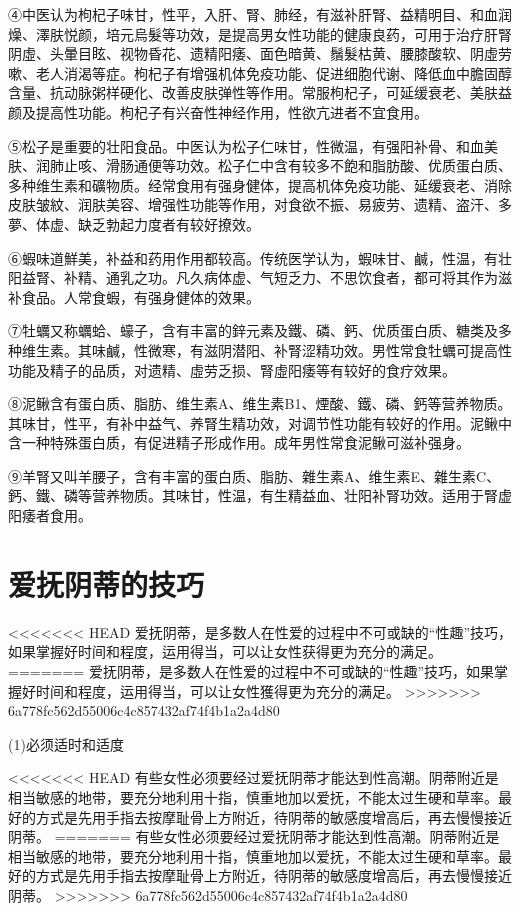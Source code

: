 \documentclass[12pt,UTF8]{ctexbook}
\begin{document}
④中医认为枸杞子味甘，性平，入肝、腎、肺经，有滋补肝腎、益精明目、和血润燥、澤肤悦颜，培元烏髮等功效，是提高男女性功能的健康良药，可用于治疗肝腎阴虛、头暈目眩、视物昏花、遗精阳痿、面色暗黄、鬚髮枯黄、腰膝酸软、阴虛劳嗽、老人消渴等症。枸杞子有增强机体免疫功能、促进细胞代谢、降低血中膽固醇含量、抗动脉粥样硬化、改善皮肤弹性等作用。常服枸杞子，可延缓衰老、美肤益颜及提高性功能。枸杞子有兴奋性神经作用，性欲亢进者不宜食用。

⑤松子是重要的壮阳食品。中医认为松子仁味甘，性微温，有强阳补骨、和血美肤、润肺止咳、滑肠通便等功效。松子仁中含有较多不飽和脂肪酸、优质蛋白质、多种维生素和礦物质。经常食用有强身健体，提高机体免疫功能、延缓衰老、消除皮肤皱紋、润肤美容、增强性功能等作用，对食欲不振、易疲劳、遗精、盗汗、多夢、体虚、缺乏勃起力度者有较好撩效。

⑥蝦味道鮮美，补益和药用作用都较高。传统医学认为，蝦味甘、鹹，性温，有壮阳益腎、补精、通乳之功。凡久病体虚、气短乏力、不思饮食者，都可将其作为滋补食品。人常食蝦，有强身健体的效果。

⑦牡蠣又称蠣蛤、蠔子，含有丰富的鋅元素及鐵、磷、鈣、优质蛋白质、糖类及多种维生素。其味鹹，性微寒，有滋阴潜阳、补腎涩精功效。男性常食牡蠣可提高性功能及精子的品质，对遗精、虛劳乏损、腎虛阳痿等有较好的食疗效果。

⑧泥鳅含有蛋白质、脂肪、维生素A、维生素B1、煙酸、鐵、磷、鈣等营养物质。其味甘，性平，有补中益气、养腎生精功效，对调节性功能有较好的作用。泥鳅中含一种特殊蛋白质，有促进精子形成作用。成年男性常食泥鳅可滋补强身。

⑨羊腎又叫羊腰子，含有丰富的蛋白质、脂肪、雜生素A、维生素E、雜生素C、鈣、鐵、磷等营养物质。其味甘，性温，有生精益血、壮阳补腎功效。适用于腎虚阳痿者食用。

\section{爱抚阴蒂的技巧}

<<<<<<< HEAD
爱抚阴蒂，是多数人在性爱的过程中不可或缺的“性趣”技巧，如果掌握好时间和程度，运用得当，可以让女性获得更为充分的满足。
=======
爱抚阴蒂，是多数人在性爱的过程中不可或缺的“性趣”技巧，如果掌握好时间和程度，运用得当，可以让女性獲得更为充分的满足。
>>>>>>> 6a778fc562d55006c4c857432af74f4b1a2a4d80

(1)必须适时和适度

<<<<<<< HEAD
有些女性必须要经过爱抚阴蒂才能达到性高潮。阴蒂附近是相当敏感的地带，要充分地利用十指，慎重地加以爱抚，不能太过生硬和草率。最好的方式是先用手指去按摩耻骨上方附近，待阴蒂的敏感度增高后，再去慢慢接近阴蒂。
=======
有些女性必须要经过爱抚阴蒂才能达到性高潮。阴蒂附近是相当敏感的地带，要充分地利用十指，慎重地加以爱抚，不能太过生硬和草率。最好的方式是先用手指去按摩耻骨上方附近，待阴蒂的敏感度增高后，再去慢慢接近阴蒂。
>>>>>>> 6a778fc562d55006c4c857432af74f4b1a2a4d80
\end{document}
